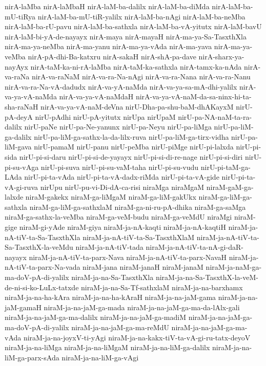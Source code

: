 {nirA-laMba
nirA-laMbaH
nirA-laM-ba-dalilx
nirA-laM-ba-diMda
nirA-laM-ba-mU-tiRya
nirA-laM-ba-mU-tiR-yalilx
nirA-laM-ba-nAgi
nirA-laM-ba-neMba
nirA-laM-ba-rU-pavu
nirA-laM-ba-sathxla
nirA-laM-ba-vA-yitutx
nirA-laM-bavU
nirA-laM-bi-yA-de-nayayx
nirA-maya
nirA-mayaH
nirA-ma-ya-Sa-TasxthXla
nirA-ma-ya-neMba
nirA-ma-yanu
nirA-ma-ya-vAda
nirA-ma-yava
nirA-ma-ya-veMba
nirA-pA-dhi-Ba-katxru
nirA-sakaH
nirA-shA-pa-dave
nirA-sharx-ya-nayAyx
nirA-taM-ka-ni-rA-laMba
nirA-taM-ka-sathxla
nirA-tamx-ka-nAda
nirA-va-raNa
nirA-va-raNaM
nirA-va-ra-Na-nAgi
nirA-va-ra-Nana
nirA-va-ra-Nanu
nirA-va-ra-Na-vA-dadudx
nirA-va-yA-naMda
nirA-va-ya-sa-mA-dhi-yalilx
nirA-va-ya-vA-naMda
nirA-va-ya-vA-naMdaH
nirA-va-ya-vA-naM-da-sa-ninx-hi-ta-sha-raNaH
nirA-va-ya-vA-naM-deVna
nirU-Dha-pa-shu-baM-dhAKayxM
nirU-pA-deyA
nirU-pAdhi
nirU-pA-yitutx
nirUpa
nirUpaM
nirU-pa-NA-naM-ta-ra-dalilx
nirU-paNe
nirU-pa-Ne-yanunx
nirU-pa-Neyu
nirU-pa-liMga
nirU-pa-liM-ga-dalilx
nirU-pa-liM-ga-sathx-la-da-lilx-ruva
nirU-pa-liM-ga-tirx-vidha
nirU-pa-liM-gava
nirU-pamaM
nirU-panu
nirU-peMba
nirU-piMge
nirU-pi-lalxda
nirU-pi-sida
nirU-pi-si-daru
nirU-pi-si-de-yayayx
nirU-pi-si-di-re-nage
nirU-pi-si-diri
nirU-pi-su-vAga
nirU-pi-suva
nirU-pi-su-vaM-taha
nirU-pi-su-vudu
nirU-pi-taM-ga-LAda
nirU-pi-ta-vAda
nirU-pi-ta-vA-dadx-riMda
nirU-pi-ta-vA-gide
nirU-pi-ta-vA-gi-ruva
nirUpu
nirU-pu-vi-Di-dA-ca-risi
niraMga
niraMgaM
niraM-gaM-ga-lalxde
niraM-gakekx
niraM-ga-liMgaM
niraM-ga-liM-gakUkx
niraM-ga-liM-ga-sathxla
niraM-ga-liM-ga-sathxlaM
niraM-ga-ni-ru-pA-dhika
niraM-ga-saMga
niraM-ga-sathx-la-veMba
niraM-ga-veM-budu
niraM-ga-veMdU
niraMgi
niraM-gige
niraM-gi-yAde
niraM-giya
niraM-ja-nA-kaqti
niraM-ja-nA-kaqtiH
niraM-ja-nA-tiV-ta-Sa-TasxthXla
niraM-ja-nA-tiV-ta-Sa-TasxthXlaM
niraM-ja-nA-tiV-ta-Sa-TasxthX-la-veMdu
niraM-ja-nA-tiV-tada
niraM-ja-nA-tiV-ta-nA-gi-daR-nayayx
niraM-ja-nA-tiV-ta-parx-Nava
niraM-ja-nA-tiV-ta-parx-NavaH
niraM-ja-nA-tiV-ta-parx-Na-vada
niraM-jana
niraM-janaH
niraM-janaM
niraM-ja-naM-ga-ma-doV-pA-di-yalilx
niraM-ja-na-Sa-TasxthXla
niraM-ja-na-Sa-TasxthX-la-veM-de-ni-si-ko-LuLx-tatxde
niraM-ja-na-Sa-Tf-sathxlaM
niraM-ja-na-barxhamx
niraM-ja-na-ha-kAra
niraM-ja-na-ha-kAraH
niraM-ja-na-jaM-gama
niraM-ja-na-jaM-gamaH
niraM-ja-na-jaM-ga-mada
niraM-ja-na-jaM-ga-ma-da-lAlx-gali
niraM-ja-na-jaM-ga-ma-dalilx
niraM-ja-na-jaM-ga-madiM
niraM-ja-na-jaM-ga-ma-doV-pA-di-yalilx
niraM-ja-na-jaM-ga-ma-reMdU
niraM-ja-na-jaM-ga-ma-vAda
niraM-ja-na-joyxV-ti-yAgi
niraM-ja-na-kakx-tiV-ta-vA-gi-ru-tatx-deyoV
niraM-ja-na-liMga
niraM-ja-na-liMgaM
niraM-ja-na-liM-ga-dalilx
niraM-ja-na-liM-ga-parx-sAda
niraM-ja-na-liM-ga-vAgi
}
